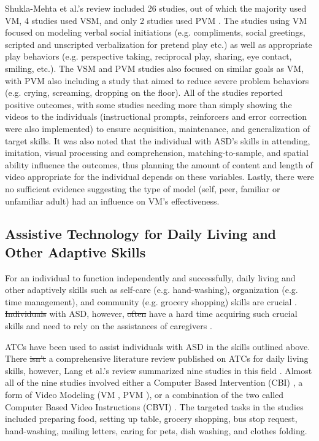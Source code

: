 \documentclass{ut-thesis}
\providecommand{\DIFaddtex}[1]{{\protect\color{blue}\uwave{#1}}} %
\providecommand{\DIFdeltex}[1]{{\protect\color{red}\sout{#1}}}                      %
\providecommand{\DIFaddbegin}{} %
\providecommand{\DIFaddend}{} %
\providecommand{\DIFdelbegin}{} %
\providecommand{\DIFdelend}{} %
\providecommand{\DIFadd}[1]{\texorpdfstring{\DIFaddtex{#1}}{#1}} %
\providecommand{\DIFdel}[1]{\texorpdfstring{\DIFdeltex{#1}}{}} %
\begin{document}
Shukla-Mehta et al.'s review included 26 studies, out of which the majority used VM, 4 studies used VSM, and only 2 studies used PVM \cite{shukla2009evaluating}.  The studies using VM focused on modeling verbal social initiations (e.g. compliments, social greetings, scripted and unscripted verbalization for pretend play etc.) as well as appropriate play behaviors (e.g. perspective taking, reciprocal play, sharing, eye contact, smiling, etc.).  The VSM and PVM studies also focused on similar goals as VM, with PVM also including a study that aimed to reduce severe problem behaviors (e.g. crying, screaming, dropping on the floor).  All of the studies reported positive outcomes, with some studies needing more than simply showing the videos to the individuals (instructional prompts, reinforcers and error correction were also implemented) to ensure acquisition, maintenance, and generalization of target skills.  It was also noted that the individual with ASD's skills in attending, imitation, visual processing and comprehension, matching-to-sample, and spatial ability influence the outcomes, thus planning the amount of content and length of video appropriate for the individual depends on these variables.  Lastly, there were no sufficient evidence suggesting the type of model (self, peer, familiar or unfamiliar adult) had an influence on VM's effectiveness.

\subsection{Assistive Technology for Daily Living and Other Adaptive Skills}
For an individual to function independently and successfully, daily living and other adaptively skills such as self-care (e.g. hand-washing), organization (e.g. time management), and community (e.g. grocery shopping) skills are crucial \cite{liss2001predictors}.  \DIFdelbegin \DIFdel{Individuals }\DIFdelend \DIFaddbegin \DIFadd{Some individuals }\DIFaddend with ASD, however, \DIFdelbegin \DIFdel{often }\DIFdelend have a hard time acquiring such crucial skills and need to rely on the assistances of caregivers \cite{smith2012developmental}.

ATCs have been used to assist individuals with ASD in the skills outlined above.  There \DIFdelbegin \DIFdel{isn't }\DIFdelend \DIFaddbegin \DIFadd{is not }\DIFaddend a comprehensive literature review published on ATCs for daily living skills, however, Lang et al.'s review summarized nine studies in this field \cite{lang2014assistive}.  Almost all of the nine studies involved either a Computer Based Intervention (CBI) \cite{hutcherson2004computer}, a form of Video Modeling (VM \cite{rosenberg2010evaluating}, PVM \cite{bereznak2012video, shipley2002teaching, sigafoos2007evaluation, sigafoos2005computer, van2010comparison}), or a combination of the two called Computer Based Video Instructions (CBVI) \cite{ayres2009acquisition, mechling2010computer}.  The targeted tasks in the studies included preparing food, setting up table, grocery shopping, bus stop request, hand-washing, mailing letters, caring for pets, dish washing, and clothes folding.
\end{document}
